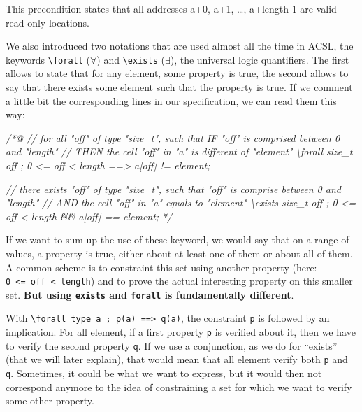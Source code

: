 \documentclass[12pt,francais,]{scrbook}
\newenvironment{Shaded}{}{}
\newcommand{\CommentTok}[1]{\textcolor[rgb]{0.38,0.63,0.69}{\textit{{#1}}}}
\begin{document}
This precondition states that all addresses a+0, a+1, \ldots{},
a+length-1 are valid read-only locations.

We also introduced two notations that are used almost all the time in
ACSL, the keywords \texttt{\textbackslash{}forall} (\(\forall\)) and
\texttt{\textbackslash{}exists} (\(\exists\)), the universal logic
quantifiers. The first allows to state that for any element, some
property is true, the second allows to say that there exists some
element such that the property is true. If we comment a little bit the
corresponding lines in our specification, we can read them this way:

\begin{footnotesize}\begin{Shaded}
\begin{Highlighting}[]
\CommentTok{/*@}
\CommentTok{// for all "off" of type "size_t", such that IF "off" is comprised between 0 and "length"}
\CommentTok{//                                 THEN the cell "off" in "a" is different of "element"}
\CommentTok{\textbackslash{}forall size_t off ; 0 <= off < length ==> a[off] != element;}

\CommentTok{// there exists "off" of type "size_t", such that "off" is comprise between 0 and "length"}
\CommentTok{//                                      AND the cell "off" in "a" equals to "element"}
\CommentTok{\textbackslash{}exists size_t off ; 0 <= off < length && a[off] == element;}
\CommentTok{*/}
\end{Highlighting}
\end{Shaded}\end{footnotesize}

If we want to sum up the use of these keyword, we would say that on a
range of values, a property is true, either about at least one of them
or about all of them. A common scheme is to constraint this set using
another property (here:
\texttt{0\ \textless{}=\ off\ \textless{}\ length}) and to prove the
actual interesting property on this smaller set. \textbf{But using
\texttt{exists} and \texttt{forall} is fundamentally different}.

With
\texttt{\textbackslash{}forall\ type\ a\ ;\ p(a)\ ==\textgreater{}\ q(a)},
the constraint \texttt{p} is followed by an implication. For all
element, if a first property \texttt{p} is verified about it, then we
have to verify the second property \texttt{q}. If we use a conjunction,
as we do for ``exists'' (that we will later explain), that would mean
that all element verify both \texttt{p} and \texttt{q}. Sometimes, it
could be what we want to express, but it would then not correspond
anymore to the idea of constraining a set for which we want to verify
some other property.
\end{document}
